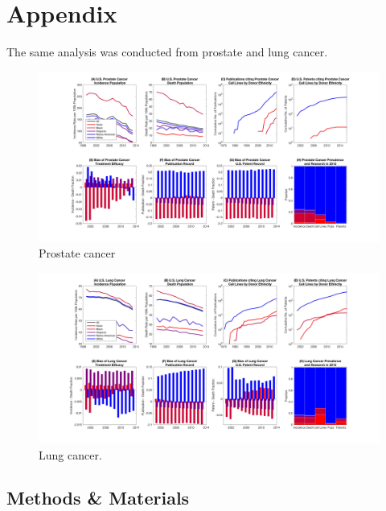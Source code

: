 \documentclass[10pt]{article}
\begin{document}



\section{Appendix}
The same analysis was conducted from prostate and lung cancer. 

\begin{figure}[h!]
\centering
\includegraphics[width=1\columnwidth, trim = {30cm 10cm 30cm 5cm}, clip]{Figures/ProstateComposite.jpg}
\caption{\label{PS2} Prostate cancer}
\end{figure}

\begin{figure}[h!]
\centering
\includegraphics[width=1\columnwidth, trim = {30cm 10cm 30cm 5cm}, clip]{Figures/LungComposite.jpg}
\caption{\label{PS3} Lung cancer.}
\end{figure}

\newpage

\subsection{Methods \& Materials}
\end{document}
